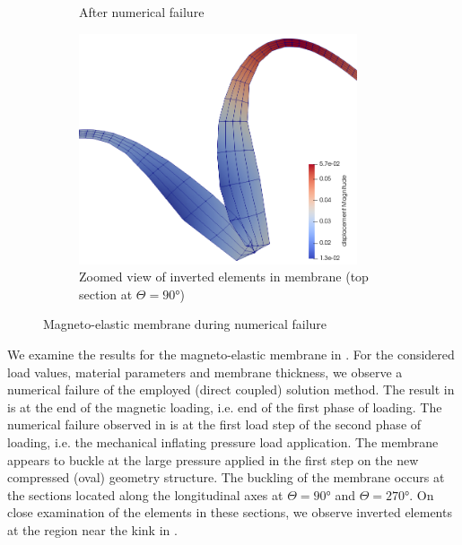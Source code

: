 \documentclass[11pt,a4paper,final]{article}
\begin{document}
\begin{figure}[h]
\begin{subfigure}{0.3\textwidth}
\caption{After numerical failure}
\label{fig:3.16.2}
\end{subfigure}
\begin{subfigure}{0.38\textwidth}
\centering
\includegraphics[width=0.9\textwidth]{instab_test_1_membrane_disp.png}
\caption{Zoomed view of inverted elements in membrane (top section at $\Theta = \ang{90}$)}
\label{fig:3.16.3}
\end{subfigure}
\caption{Magneto-elastic membrane during numerical failure}
\label{fig:3.16}
\end{figure}

We examine the results for the magneto-elastic membrane in . For the considered load values, material parameters and membrane thickness, we observe a numerical failure of the employed (direct coupled) solution method. The result in  is at the end of the magnetic loading, i.e. end of the first phase of loading. The numerical failure observed in  is at the first load step of the second phase of loading, i.e. the mechanical inflating pressure load application. The membrane appears to buckle at the large pressure applied in the first step on the new compressed (oval) geometry structure. The buckling of the membrane occurs at the sections located along the longitudinal axes at $\Theta = \ang{90}$ and $\Theta = \ang{270}$. On close examination of the elements in these sections, we observe inverted elements at the region near the kink in . \par 
\end{document}
